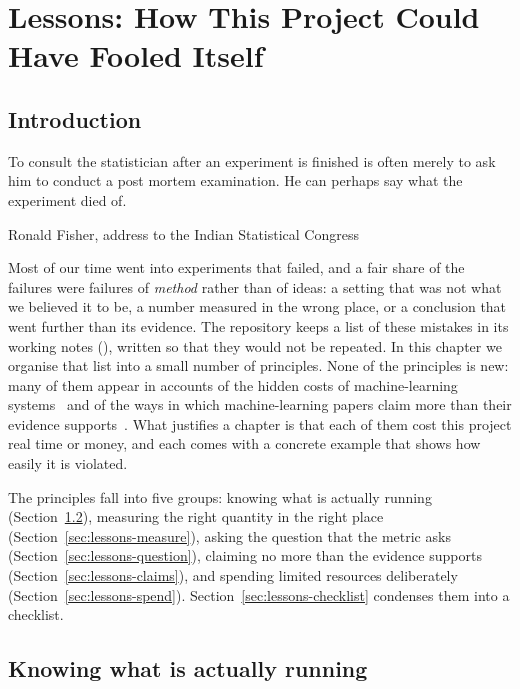 \chapter{Lessons: How This Project Could Have Fooled Itself}\label{ch:lessons}

\section{Introduction}\label{sec:lessons-why}
\epigraph{To consult the statistician after an experiment is finished is often merely to ask him to
conduct a post mortem examination. He can perhaps say what the experiment died of.}{Ronald Fisher,
address to the Indian Statistical Congress \citeyearpar{fisher1938}}

Most of our time went into experiments that failed, and a fair share of the failures were failures of
\emph{method} rather than of ideas: a setting that was not what we believed it to be, a number
measured in the wrong place, or a conclusion that went further than its evidence. The repository keeps
a list of these mistakes in its working notes (), written so that they would not be
repeated. In this chapter we organise that list into a small number of principles. None of the
principles is new: many of them appear in accounts of the hidden costs of machine-learning
systems~\citep{sculley2015} and of the ways in which machine-learning papers claim more than their
evidence supports~\citep{lipton2019}. What justifies a chapter is that each of them cost this project real time or money,
and each comes with a concrete example that shows how easily it is violated.

The principles fall into five groups: knowing what is actually running
(Section~\ref{sec:lessons-config}), measuring the right quantity in the right place
(Section~\ref{sec:lessons-measure}), asking the question that the metric asks
(Section~\ref{sec:lessons-question}), claiming no more than the evidence supports
(Section~\ref{sec:lessons-claims}), and spending limited resources deliberately
(Section~\ref{sec:lessons-spend}). Section~\ref{sec:lessons-checklist} condenses them into a checklist.

\section{Knowing what is actually running}\label{sec:lessons-config}

